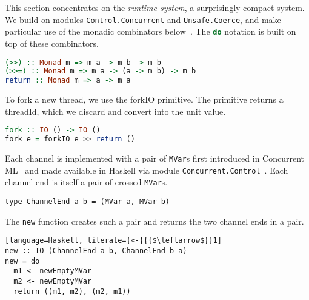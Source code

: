%
This section concentrates on the \emph{runtime system}, a surprisingly
compact system. We build on modules \lstinline|Control.Concurrent| and
\lstinline|Unsafe.Coerce|, and make particular use of the monadic
combinators below~\cite{DBLP:conf/afp/Wadler95}. The
\lstinline[language=Haskell]|do| notation is built on top of these
combinators.
%
\begin{lstlisting}[language=Haskell]
(>>) :: Monad m => m a -> m b -> m b
(>>=) :: Monad m => m a -> (a -> m b) -> m b
return :: Monad m => a -> m a
\end{lstlisting}

To fork a new thread, we use the forkIO primitive. The primitive
returns a threadId, which we discard and convert into the unit value.
%
\begin{lstlisting}[language=Haskell]
fork :: IO () -> IO ()
fork e = forkIO e >> return ()
\end{lstlisting}

Each channel is implemented with a pair of \lstinline|MVar|s first
introduced in Concurrent ML~\cite{DBLP:conf/mcmaster/Reppy93} and made
available in Haskell via module
\lstinline|Concurrent.Control|~\cite{DBLP:conf/popl/JonesGF96}. Each
channel end is itself a pair of crossed \lstinline|MVar|s.
%
\begin{lstlisting}
type ChannelEnd a b = (MVar a, MVar b)
\end{lstlisting}

The \lstinline|new| function creates such a pair and returns the two
channel ends in a pair.
%
\begin{lstlisting}[language=Haskell, literate={<-}{{$\leftarrow$}}1]
new :: IO (ChannelEnd a b, ChannelEnd b a)
new = do
  m1 <- newEmptyMVar
  m2 <- newEmptyMVar
  return ((m1, m2), (m2, m1))
\end{lstlisting}

